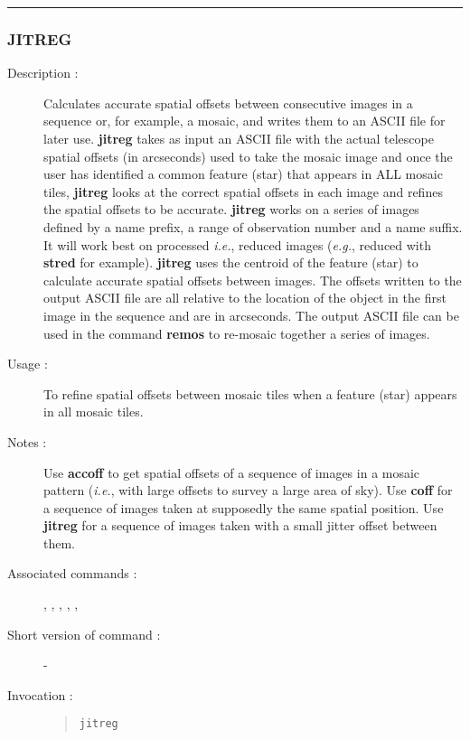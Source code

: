 \hrule 
\subsubsection*{\label{JITREG}JITREG}

\begin{description}

\item[Description :] Calculates accurate spatial offsets
between consecutive images in a sequence or, for example, a mosaic, and
writes them to an ASCII file for later use.  {\bf jitreg} takes as input an
ASCII file with the actual telescope spatial offsets (in arcseconds)
used to take the mosaic image and once the user has identified a common
feature (star) that appears in ALL mosaic tiles, {\bf jitreg} looks at the
correct spatial offsets in each image and refines the spatial offsets
to be accurate.  {\bf jitreg} works on a series of images defined by a name
prefix, a range of observation number and a name suffix.  It will work
best on processed \emph{i.e.}, reduced images (\emph{e.g.}, reduced
with {\bf stred} for example).  {\bf jitreg} uses the centroid of the feature
(star) to calculate accurate spatial offsets between images.  The
offsets written to the output ASCII file are all relative to the
location of the object in the first image in the sequence and are in
arcseconds.  The output ASCII file can be used in the command {\bf remos} to
re-mosaic together a series of images.

\item[Usage :] To refine spatial offsets between mosaic tiles when a
feature (star) appears in all mosaic tiles.

\item[Notes :] Use {\bf accoff} to get spatial offsets of a sequence of
images in a mosaic pattern (\emph{i.e.}, with large offsets to survey a
large area of sky).  Use {\bf coff} for a sequence of images taken at
supposedly the same spatial position. Use {\bf jitreg} for a sequence
of images taken with a small jitter offset between them.

\item[Associated commands :] {\tt {}}, 
{\tt {}}, {\tt {}}, 
{\tt {}}, {\tt {}}, 
{\tt {}}
\item[Short version of command :] -
\item[Invocation :]

\begin{quote}{\tt  jitreg }\end{quote}

\end{description}

